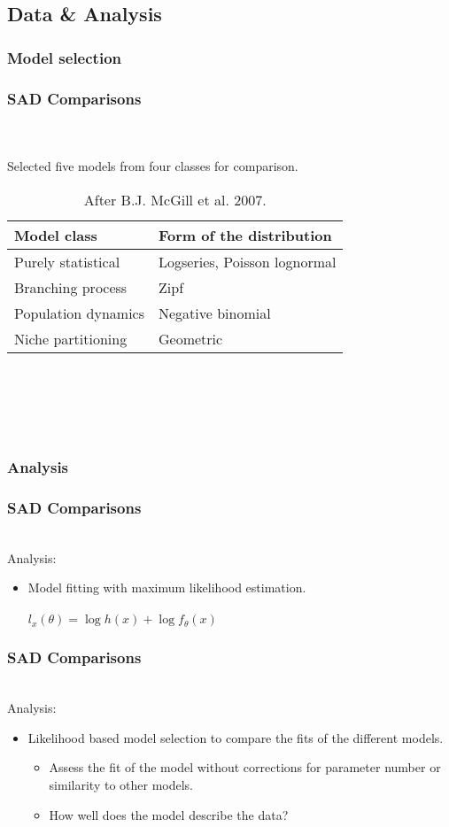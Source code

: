 \documentclass[14pt]{beamer}
\begin{document}
\subsection{Data & Analysis}
\subsubsection{Model selection}
\begin{frame}[shrink=10]
\frametitle{SAD Comparisons}
~\\
~\\
Selected five models from four classes for comparison.
\begin{table}
\begin{tabular}{l|l}
 Model class & Form of the distribution\\ 
\hline
 Purely statistical & Logseries, Poisson lognormal\\
 Branching process & Zipf \\
 Population dynamics & Negative binomial\\
 Niche partitioning & Geometric \\
\end{tabular}
~\\
~\\
~\\
~\\
\caption{After B.J. McGill et al. 2007.}
\end{table}
\end{frame}

\subsubsection{Analysis}
\begin{frame}[t]
\frametitle{SAD Comparisons}
~\\
Analysis:
\begin{itemize}
\item Model fitting with maximum likelihood estimation.\\
~\\
$l_x(\theta) = \log h(x) + \log f_\theta(x)$
\end{itemize}
\end{frame} 


\begin{frame}[t]
\frametitle{SAD Comparisons}
~\\
Analysis:
\begin{itemize}
\item Likelihood based model selection to compare the fits of the different models.
\begin{itemize}
\item Assess the fit of the model without corrections for parameter number or similarity to other models.
\item How well does the model describe the data?
\end{itemize}
\end{itemize}
\end{frame}
\end{document}
